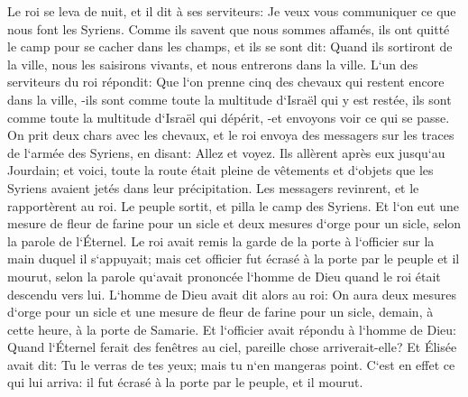 \verse Le roi se leva de nuit, et il dit à ses serviteurs: Je veux vous communiquer ce que nous font les Syriens. Comme ils savent que nous sommes affamés, ils ont quitté le camp pour se cacher dans les champs, et ils se sont dit: Quand ils sortiront de la ville, nous les saisirons vivants, et nous entrerons dans la ville. 
\verse L`un des serviteurs du roi répondit: Que l`on prenne cinq des chevaux qui restent encore dans la ville, -ils sont comme toute la multitude d`Israël qui y est restée, ils sont comme toute la multitude d`Israël qui dépérit, -et envoyons voir ce qui se passe. 
\verse On prit deux chars avec les chevaux, et le roi envoya des messagers sur les traces de l`armée des Syriens, en disant: Allez et voyez. 
\verse Ils allèrent après eux jusqu`au Jourdain; et voici, toute la route était pleine de vêtements et d`objets que les Syriens avaient jetés dans leur précipitation. Les messagers revinrent, et le rapportèrent au roi. 
\verse Le peuple sortit, et pilla le camp des Syriens. Et l`on eut une mesure de fleur de farine pour un sicle et deux mesures d`orge pour un sicle, selon la parole de l`Éternel. 
\verse Le roi avait remis la garde de la porte à l`officier sur la main duquel il s`appuyait; mais cet officier fut écrasé à la porte par le peuple et il mourut, selon la parole qu`avait prononcée l`homme de Dieu quand le roi était descendu vers lui. 
\verse L`homme de Dieu avait dit alors au roi: On aura deux mesures d`orge pour un sicle et une mesure de fleur de farine pour un sicle, demain, à cette heure, à la porte de Samarie. 
\verse Et l`officier avait répondu à l`homme de Dieu: Quand l`Éternel ferait des fenêtres au ciel, pareille chose arriverait-elle? Et Élisée avait dit: Tu le verras de tes yeux; mais tu n`en mangeras point. 
\verse C`est en effet ce qui lui arriva: il fut écrasé à la porte par le peuple, et il mourut. 

